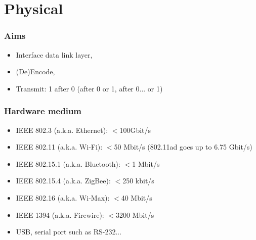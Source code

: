 \section{Physical}

  \begin{frame}
    \frametitle{Aims}
      \begin{itemize}
        \item Interface data link layer,
        \item (De)Encode,
        \item Transmit: 1 after 0 (after 0 or 1, after 0... or 1)
      \end{itemize}
  \end{frame}

  \begin{frame}
    \frametitle{Hardware medium}
      \begin{itemize}
        \item IEEE 802.3 (a.k.a. Ethernet): $<$100Gbit/s
        \item IEEE 802.11 (a.k.a. Wi-Fi): $<$50 Mbit/s (802.11ad goes up to 6.75 Gbit/s)
        \item IEEE 802.15.1 (a.k.a. Bluetooth): $<$1 Mbit/s
        \item IEEE 802.15.4 (a.k.a. ZigBee): $<$250 kbit/s
        \item IEEE 802.16 (a.k.a. Wi-Max): $<$40 Mbit/s
        \item IEEE 1394 (a.k.a. Firewire): $<$3200 Mbit/s
        \item USB, serial port such as RS-232...
      \end{itemize}
  \end{frame}

